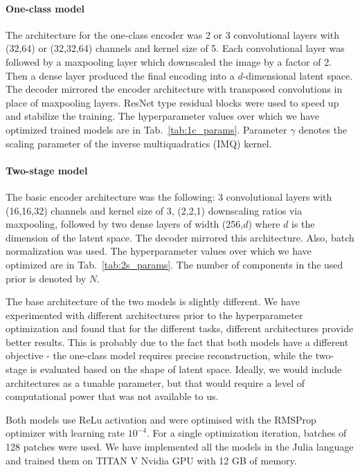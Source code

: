 \paragraph{One-class model}
The architecture for the one-class encoder was 2 or 3 convolutional layers with (32,64) or (32,32,64) channels and kernel size of 5. Each convolutional layer was followed by a maxpooling layer which downscaled the image by a factor of 2. Then a dense layer produced the final encoding into a $d$-dimensional latent space. The decoder mirrored the encoder architecture with transposed convolutions in place of maxpooling layers. ResNet\cite{he2016deep} type residual blocks were used to speed up and stabilize the training. The hyperparameter values over which we have optimized trained models are in Tab.~\ref{tab:1c_params}.
Parameter $\gamma$ denotes the scaling parameter of the inverse multiquadratics (IMQ) kernel\cite{gorham2017measuring}.

\paragraph{Two-stage model}
The basic encoder architecture was the following: 3 convolutional layers with (16,16,32) channels and kernel size of 3, (2,2,1) downscaling ratios via maxpooling, followed by two dense layers of width (256,$d$) where $d$ is the dimension of the latent space. The decoder mirrored this architecture. Also, batch normalization\cite{ioffe2015batch} was used. The hyperparameter values over which we have optimized are in Tab.~\ref{tab:2s_params}. The number of components in the used prior is denoted by $N$. 

The base architecture of the two models is slightly different. We have experimented with different architectures prior to the hyperparameter optimization and found that for the different tasks, different architectures provide better results. This is probably due to the fact that both models have a different objective - the one-class model requires precise reconstruction, while the two-stage is evaluated based on the shape of latent space. Ideally, we would include architectures as a tunable parameter, but that would require a level of computational power that was not available to us.

Both models use ReLu\cite{hahnloser2000digital} activation and were optimised with the RMSProp optimizer with learning rate $10^{-4}$. For a single optimization iteration, batches of 128 patches were used. We have implemented all the models in the Julia language\cite{bezanson2017julia} and trained them on TITAN V Nvidia GPU with 12 GB of memory. 

